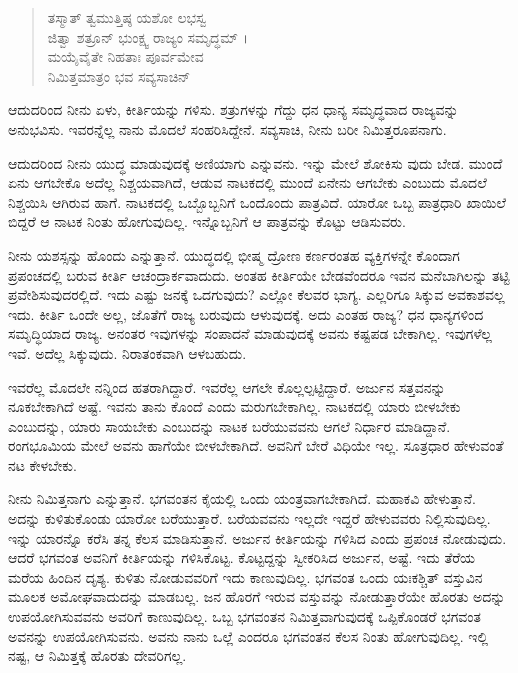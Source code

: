 \begin{verse}
ತಸ್ಮಾತ್ ತ್ವಮುತ್ತಿಷ್ಠ ಯಶೋ ಲಭಸ್ವ\\ ಜಿತ್ವಾ ಶತ್ರೂನ್ ಭುಂಕ್ಷ್ವ ರಾಜ್ಯಂ ಸಮೃದ್ಧಮ್ ।\\ಮಯೈವೈತೇ ನಿಹತಾಃ ಪೂರ್ವಮೇವ\\ ನಿಮಿತ್ತಮಾತ್ರಂ ಭವ ಸವ್ಯಸಾಚಿನ್ 
\end{verse}

{\small ಆದುದರಿಂದ ನೀನು ಏಳು, ಕೀರ್ತಿಯನ್ನು ಗಳಿಸು. ಶತ್ರುಗಳನ್ನು ಗೆದ್ದು ಧನ ಧಾನ್ಯ ಸಮೃದ್ಧವಾದ ರಾಜ್ಯವನ್ನು ಅನುಭವಿಸು. ಇವರನ್ನೆಲ್ಲ ನಾನು ಮೊದಲೆ ಸಂಹರಿಸಿದ್ದೇನೆ. ಸವ್ಯಸಾಚಿ, ನೀನು ಬರೀ ನಿಮಿತ್ತರೂಪನಾಗು.}

ಆದುದರಿಂದ ನೀನು ಯುದ್ಧ ಮಾಡುವುದಕ್ಕೆ ಅಣಿಯಾಗು ಎನ್ನುವನು. ಇನ್ನು ಮೇಲೆ ಶೋಕಿಸು ವುದು ಬೇಡ. ಮುಂದೆ ಏನು ಆಗಬೇಕೊ ಅದೆಲ್ಲ ನಿಶ್ಚಯವಾಗಿದೆ, ಆಡುವ ನಾಟಕದಲ್ಲಿ ಮುಂದೆ ಏನೇನು ಆಗಬೇಕು ಎಂಬುದು ಮೊದಲೆ ನಿಶ್ಚಯಿಸಿ ಆಗಿರುವ ಹಾಗೆ. ನಾಟಕದಲ್ಲಿ ಒಬ್ಬೊಬ್ಬನಿಗೆ ಒಂದೊಂದು ಪಾತ್ರವಿದೆ. ಯಾರೋ ಒಬ್ಬ ಪಾತ್ರಧಾರಿ ಖಾಯಿಲೆ ಬಿದ್ದರೆ ಆ ನಾಟಕ ನಿಂತು ಹೋಗುವುದಿಲ್ಲ. ಇನ್ನೊಬ್ಬನಿಗೆ ಆ ಪಾತ್ರವನ್ನು ಕೊಟ್ಟು ಆಡಿಸುವರು.

ನೀನು ಯಶಸ್ಸನ್ನು ಹೊಂದು ಎನ್ನುತ್ತಾನೆ. ಯುದ್ಧದಲ್ಲಿ ಭೀಷ್ಮ ದ್ರೋಣ ಕರ್ಣರಂತಹ ವ್ಯಕ್ತಿಗಳನ್ನೇ ಕೊಂದಾಗ ಪ್ರಪಂಚದಲ್ಲಿ ಬರುವ ಕೀರ್ತಿ ಆಚಂದ್ರಾರ್ಕವಾದುದು. ಅಂತಹ ಕೀರ್ತಿಯೇ ಬೇಡವೆಂದರೂ ಇವನ ಮನೆಬಾಗಿಲನ್ನು ತಟ್ಟಿ ಪ್ರವೇಶಿಸುವುದರಲ್ಲಿದೆ. ಇದು ಎಷ್ಟು ಜನಕ್ಕೆ ಒದಗುವುದು? ಎಲ್ಲೋ ಕೆಲವರ ಭಾಗ್ಯ. ಎಲ್ಲರಿಗೂ ಸಿಕ್ಕುವ ಅವಕಾಶವಲ್ಲ ಇದು. ಕೀರ್ತಿ ಒಂದೇ ಅಲ್ಲ, ಜೊತೆಗೆ ರಾಜ್ಯ ಬರುವುದು ಆಳುವುದಕ್ಕೆ. ಅದು ಎಂತಹ ರಾಜ್ಯ? ಧನ ಧಾನ್ಯಗಳಿಂದ ಸಮೃದ್ಧಿಯಾದ ರಾಜ್ಯ. ಅನಂತರ ಇವುಗಳನ್ನು ಸಂಪಾದನೆ ಮಾಡುವುದಕ್ಕೆ ಅವನು ಕಷ್ಟಪಡ ಬೇಕಾಗಿಲ್ಲ. ಇವುಗಳೆಲ್ಲ ಇವೆ. ಅದೆಲ್ಲ ಸಿಕ್ಕುವುದು. ನಿರಾತಂಕವಾಗಿ ಆಳಬಹುದು.

ಇವರೆಲ್ಲ ಮೊದಲೇ ನನ್ನಿಂದ ಹತರಾಗಿದ್ದಾರೆ. ಇವರೆಲ್ಲ ಆಗಲೇ ಕೊಲ್ಲಲ್ಪಟ್ಟಿದ್ದಾರೆ. ಅರ್ಜುನ ಸತ್ತವನನ್ನು ನೂಕಬೇಕಾಗಿದೆ ಅಷ್ಟೆ. ಇವನು ತಾನು ಕೊಂದೆ ಎಂದು ಮರುಗಬೇಕಾಗಿಲ್ಲ. ನಾಟಕದಲ್ಲಿ ಯಾರು ಬೀಳಬೇಕು ಎಂಬುದನ್ನು, ಯಾರು ಸಾಯಬೇಕು ಎಂಬುದನ್ನು ನಾಟಕ ಬರೆಯುವವನು ಆಗಲೆ ನಿರ್ಧಾರ ಮಾಡಿದ್ದಾನೆ. ರಂಗಭೂಮಿಯ ಮೇಲೆ ಅವನು ಹಾಗೆಯೇ ಬೀಳಬೇಕಾಗಿದೆ. ಅವನಿಗೆ ಬೇರೆ ವಿಧಿಯೇ ಇಲ್ಲ. ಸೂತ್ರಧಾರ ಹೇಳುವಂತೆ ನಟ ಕೇಳಬೇಕು.

ನೀನು ನಿಮಿತ್ತನಾಗು ಎನ್ನುತ್ತಾನೆ. ಭಗವಂತನ ಕೈಯಲ್ಲಿ ಒಂದು ಯಂತ್ರವಾಗಬೇಕಾಗಿದೆ. ಮಹಾಕವಿ ಹೇಳುತ್ತಾನೆ. ಅದನ್ನು ಕುಳಿತುಕೊಂಡು ಯಾರೋ ಬರೆಯುತ್ತಾರೆ. ಬರೆಯವವನು ಇಲ್ಲದೇ ಇದ್ದರೆ ಹೇಳುವವರು ನಿಲ್ಲಿಸುವುದಿಲ್ಲ. ಇನ್ನು ಯಾರನ್ನೊ ಕರೆಸಿ ತನ್ನ ಕೆಲಸ ಮಾಡಿಸುತ್ತಾನೆ. ಅರ್ಜುನ ಕೀರ್ತಿಯನ್ನು ಗಳಿಸಿದ ಎಂದು ಪ್ರಪಂಚ ನೋಡುವುದು. ಆದರೆ ಭಗವಂತ ಅವನಿಗೆ ಕೀರ್ತಿಯನ್ನು ಗಳಿಸಿಕೊಟ್ಟ. ಕೊಟ್ಟದ್ದನ್ನು ಸ್ವೀಕರಿಸಿದ ಅರ್ಜುನ, ಅಷ್ಟೆ. ಇದು ತೆರೆಯ ಮರೆಯ ಹಿಂದಿನ ದೃಶ್ಯ. ಕುಳಿತು ನೋಡುವವರಿಗೆ ಇದು ಕಾಣುವುದಿಲ್ಲ. ಭಗವಂತ ಒಂದು ಯಃಕಶ್ಚಿತ್ ವಸ್ತುವಿನ ಮೂಲಕ ಅಮೋಘವಾದುದನ್ನು ಮಾಡಬಲ್ಲ. ಜನ ಹೊರಗೆ ಇರುವ ವಸ್ತುವನ್ನು ನೋಡುತ್ತಾರೆಯೇ ಹೊರತು ಅದನ್ನು ಉಪಯೋಗಿಸುವವನು ಅವರಿಗೆ ಕಾಣುವುದಿಲ್ಲ. ಒಬ್ಬ ಭಗವಂತನ ನಿಮಿತ್ತವಾಗುವುದಕ್ಕೆ ಒಪ್ಪಿಕೊಂಡರೆ ಭಗವಂತ ಅವನನ್ನು ಉಪಯೋಗಿಸುವನು. ಅವನು ನಾನು ಒಲ್ಲೆ ಎಂದರೂ ಭಗವಂತನ ಕೆಲಸ ನಿಂತು ಹೋಗುವುದಿಲ್ಲ. ಇಲ್ಲಿ ನಷ್ಟ, ಆ ನಿಮಿತ್ತಕ್ಕೆ ಹೊರತು ದೇವರಿಗಲ್ಲ.

